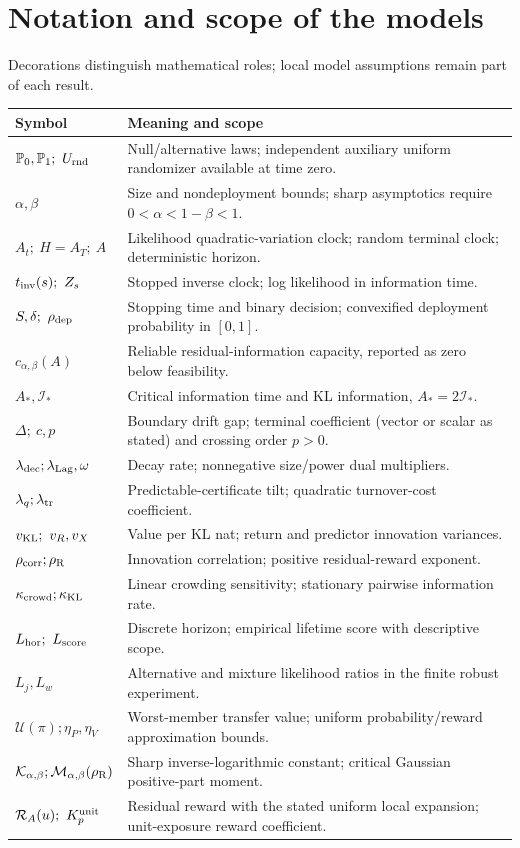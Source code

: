\documentclass[11pt]{article}
\numberwithin{equation}{section}
\theoremstyle{plain}
\theoremstyle{definition}
\theoremstyle{remark}
\begin{document}
\section{Notation and scope of the models}\label{app:notation}

Decorations distinguish mathematical roles; local model assumptions remain part of each result.
\begin{center}\small
\begin{tabular}{@{}p{}p{}@{}}
\toprule Symbol & Meaning and scope\\\midrule
$\mathbb P_0,\mathbb P_1;\ U_{\rm rnd}$ & Null/alternative laws; independent auxiliary uniform randomizer available at time zero.\\
$\alpha,\beta$ & Size and nondeployment bounds; sharp asymptotics require $0<\alpha<1-\beta<1$.\\
$A_t;\ H=A_T;\ A$ & Likelihood quadratic-variation clock; random terminal clock; deterministic horizon.\\
$t_{\rm inv}(s);\ Z_s$ & Stopped inverse clock; log likelihood in information time.\\
$S,\delta;\ \rho_{\rm dep}$ & Stopping time and binary decision; convexified deployment probability in $[0,1]$.\\
$c_{\alpha,\beta}(A)$ & Reliable residual-information capacity, reported as zero below feasibility.\\
$A_*,\mathcal I_*$ & Critical information time and KL information, $A_*=2\mathcal I_*$.\\
$\Delta;\ c,p$ & Boundary drift gap; terminal coefficient (vector or scalar as stated) and crossing order $p>0$.\\
$\lambda_{\rm dec};\lambda_{\rm Lag},\omega$ & Decay rate; nonnegative size/power dual multipliers.\\
$\lambda_q;\lambda_{\rm tr}$ & Predictable-certificate tilt; quadratic turnover-cost coefficient.\\
$v_{\rm KL};\ v_R,v_X$ & Value per KL nat; return and predictor innovation variances.\\
$\rho_{\rm corr};\rho_{\rm R}$ & Innovation correlation; positive residual-reward exponent.\\
$\kappa_{\rm crowd};\kappa_{\rm KL}$ & Linear crowding sensitivity; stationary pairwise information rate.\\
$L_{\rm hor};\ L_{\rm score}$ & Discrete horizon; empirical lifetime score with descriptive scope.\\
$L_j,L_w$ & Alternative and mixture likelihood ratios in the finite robust experiment.\\
$\mathcal U(\pi);\eta_P,\eta_V$ & Worst-member transfer value; uniform probability/reward approximation bounds.\\
$\mathcal K_{\alpha,\beta};\mathcal M_{\alpha,\beta}(\rho_{\rm R})$ & Sharp inverse-logarithmic constant; critical Gaussian positive-part moment.\\
$\mathcal R_A(u);\ K_p^{\rm unit}$ & Residual reward with the stated uniform local expansion; unit-exposure reward coefficient.\\
\bottomrule
\end{tabular}
\end{center}
\end{document}
